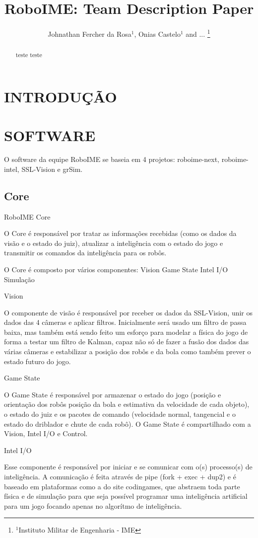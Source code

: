 \documentclass[letterpaper, 10 pt, conference]{ieeeconf}  %
\title{\LARGE \bf
RoboIME: Team Description Paper}
\author{
Johnathan Fercher da Rosa$^{1}$, Onias Castelo$^{1}$ and ...
\thanks{$^{1}$Instituto Militar de Engenharia - IME}%
}
\begin{document}
\maketitle
\thispagestyle{empty}
\pagestyle{empty}


\begin{abstract}
	teste teste
\end{abstract}


\section{INTRODUÇÃO}

\section{SOFTWARE}
O software da equipe RoboIME se baseia em 4 projetos: roboime-next, roboime-intel, SSL-Vision e grSim.

\subsection{Core}
RoboIME Core

O Core é responsável por tratar as informações recebidas (como os dados da visão e o estado do juiz), atualizar a inteligência com o estado do jogo e transmitir os comandos da inteligência para os robôs.

O Core é composto por vários componentes:
Vision
Game State
Intel I/O
Simulação

Vision

O componente de visão é responsável por receber os dados da SSL-Vision, unir os dados das 4 câmeras e aplicar filtros. Inicialmente será usado um filtro de passa baixa, mas também está sendo feito um esforço para modelar a física do jogo de forma a testar um filtro de Kalman, capaz não só de fazer a fusão dos dados das várias câmeras e estabilizar a posição dos robôs e da bola como também prever o estado futuro do jogo.

Game State

O Game State é responsável por armazenar o estado do jogo (posição e orientação dos robôs posição da bola e estimativa da velocidade de cada objeto), o estado do juiz e os pacotes de comando (velocidade normal, tangencial e o estado do driblador e chute de cada robô). O Game State é compartilhado com a Vision, Intel I/O e Control.

Intel I/O

Esse componente é responsável por iniciar e se comunicar com o(s) processo(s) de inteligência. A comunicação é feita através de pipe (fork + exec + dup2) e é baseado em plataformas como a do site codingames, que abstraem toda parte física e de simulação para que seja possível programar uma inteligência artificial para um jogo focando apenas no algorítmo de inteligência.
\end{document}
